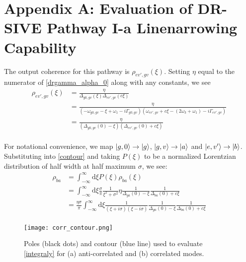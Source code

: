 \documentclass[aip, jcp, draft, onecolumn]{revtex4-2}
\begin{document}
\section{Appendix A: Evaluation of DR-SIVE Pathway I-a Linenarrowing Capability}
\begin{widetext}
The output coherence  for this pathway is $\rho_{ev',gv}(\xi)$.
Setting $\eta$ equal to the numerator of \autoref{drgamma_alpha_0} along with any constants, we see
\begin{equation}\label{ev'gv}
	\begin{split}
		\rho_{ev',gv}(\xi) &= \frac{\eta}{\Delta_{g0,gv}(\xi) \Delta_{ev',gv}(c\xi)}\\
		&=  \frac{\eta}{(-\omega_{g0,gv} - \xi + \omega_1 - i\Gamma_{g0,gv})(\omega_{ev',gv} + c\xi - (2\omega_3 + \omega_1) - i\Gamma_{ev',gv})}\\ 
		&= \frac{\eta}{(\Delta_{g0,gv}(0) - \xi)(\Delta_{ev',gv}(0) + c\xi)}\\ 
	\end{split}
\end{equation}

For notational convenience, we map $\ket{g,0} \rightarrow \ket{g}$, $\ket{g,v} \rightarrow \ket{a}$ and $\ket{e,v'} \rightarrow \ket{b}$.
Substituting into \autoref{contour} and taking $P(\xi)$ to be a normalized Lorentzian distribution of half width at half maximum $\sigma$, we see:
\begin{equation}\label{integraly}
	\begin{split}
		\rho_{ba} &= \int_{-\infty}^\infty \mathrm{d}\xi P(\xi) \rho_{ba}(\xi)\\
		&= \int_{-\infty}^\infty \mathrm{d}\xi \frac{\sigma}{\pi} \frac{1}{\xi^2 + \sigma^2} \eta \frac{1}{\Delta_{ga}(0) - \xi} \frac{1}{\Delta_{ba}(0) + c\xi}\\
		&= \frac{\eta \sigma}{\pi} \int_{-\infty}^\infty \mathrm{d}\xi\frac{1}{(\xi + i\sigma)(\xi - i\sigma)} \frac{1}{\Delta_{ga}(0) - \xi} \frac{1}{\Delta_{ba}(0) + c\xi}\\
	\end{split}
\end{equation}

\begin{figure}[!htbp]
	\centering
	\texttt{[image: corr\_contour.png]}
	\caption{Poles (black dots) and contour (blue line) used to evaluate \autoref{integraly} for (a) anti-correlated and (b) correlated modes.} 
	\label{fig:contours}
\end{figure}


\end{widetext}
\end{document}
